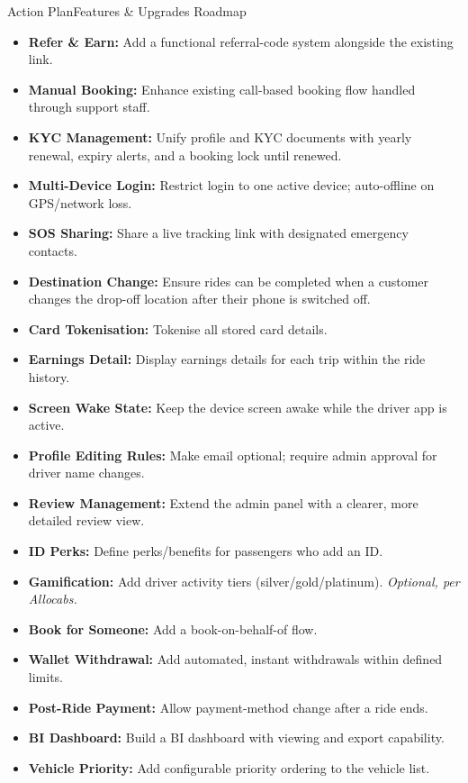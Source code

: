 \documentclass[11pt,a4paper]{article}
\begin{document}
\begin{recbox}{Action Plan}{Features \& Upgrades Roadmap}
\begin{itemize}
  \item \textbf{Refer \& Earn:} Add a functional referral-code system alongside the existing link.
  \item \textbf{Manual Booking:} Enhance existing call-based booking flow handled through support staff.
  \item \textbf{KYC Management:} Unify profile and KYC documents with yearly renewal, expiry alerts, and a booking lock until renewed.
  \item \textbf{Multi-Device Login:} Restrict login to one active device; auto-offline on GPS/network loss.
  \item \textbf{SOS Sharing:} Share a live tracking link with designated emergency contacts.
  \item \textbf{Destination Change:} Ensure rides can be completed when a customer changes the drop-off location after their phone is switched off.
  \item \textbf{Card Tokenisation:} Tokenise all stored card details.
  \item \textbf{Earnings Detail:} Display earnings details for each trip within the ride history.
  \item \textbf{Screen Wake State:} Keep the device screen awake while the driver app is active.
  \item \textbf{Profile Editing Rules:} Make email optional; require admin approval for driver name changes.
  \item \textbf{Review Management:} Extend the admin panel with a clearer, more detailed review view.
  \item \textbf{ID Perks:} Define perks/benefits for passengers who add an ID.
  \item \textbf{Gamification:} Add driver activity tiers (silver/gold/platinum). \textit{Optional, per Allocabs.}
  \item \textbf{Book for Someone:} Add a book-on-behalf-of flow.
  \item \textbf{Wallet Withdrawal:} Add automated, instant withdrawals within defined limits.
  \item \textbf{Post-Ride Payment:} Allow payment-method change after a ride ends.
  \item \textbf{BI Dashboard:} Build a BI dashboard with viewing and export capability.
  \item \textbf{Vehicle Priority:} Add configurable priority ordering to the vehicle list.
\end{itemize}
\end{recbox}
\end{document}
